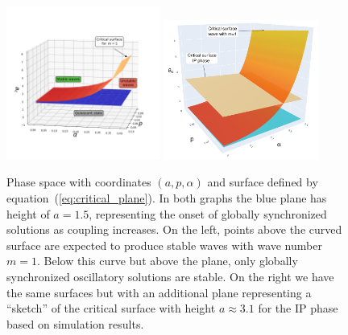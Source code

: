 \begin{figure}
  \centering
  \includegraphics[width=0.45\textwidth]{fig/chap4/critical_plane.png}
  \includegraphics[width=0.45\textwidth]{fig/chap4/critical_plane_IP.png}
	\caption{
		Phase space with coordinates $(a,p,\alpha)$ and surface defined by equation~(\ref{eq:critical_plane}). In both graphs the blue
		plane has height of $a=1.5$, representing the onset of globally synchronized solutions as coupling increases. On the left, points
		above the curved surface are expected to produce stable waves with wave number $m=1$. Below this curve but above the plane, only
		globally synchronized oscillatory solutions are stable. On the right we have the same surfaces but with an additional plane
		representing a ``sketch'' of the critical surface with height $a\approx 3.1$ for the IP phase based on simulation results.
	}
	\label{fig:critical_plane}
\end{figure}

